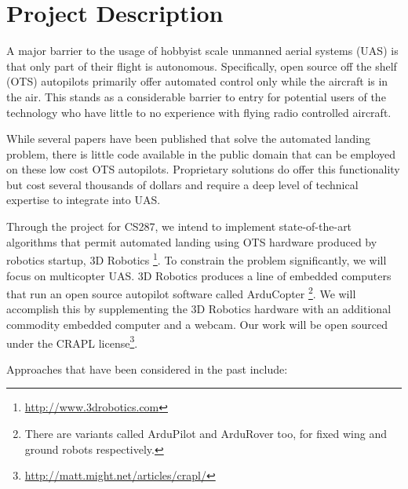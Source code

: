 \section*{Project Description}

A major barrier to the usage of hobbyist scale unmanned aerial systems (UAS) is that only part of their flight is autonomous. Specifically, open source off the shelf (OTS) autopilots primarily offer automated control only while the aircraft is in the air. This stands as a considerable barrier to entry for potential users of the technology who have little to no experience with flying radio controlled aircraft.

While several papers have been published that solve the automated landing problem, there is little code available in the public domain that can be employed on these low cost OTS autopilots. Proprietary solutions do offer this functionality but cost several thousands of dollars and require a deep level of technical expertise to integrate into UAS. 

Through the project for CS287, we intend to implement state-of-the-art algorithms that permit automated landing using OTS hardware produced by robotics startup, 3D Robotics \footnote{\url{http://www.3drobotics.com}}. To constrain the problem significantly, we will focus on multicopter UAS. 3D Robotics produces a line of embedded computers that run an open source autopilot software called ArduCopter \footnote{There are variants called ArduPilot and ArduRover too, for fixed wing and ground robots respectively.}. We will accomplish this by supplementing the 3D Robotics hardware with an additional commodity embedded computer and a webcam. Our work will be open sourced under the CRAPL license\footnote{\url{http://matt.might.net/articles/crapl/}}.

Approaches that have been considered in the past include:

